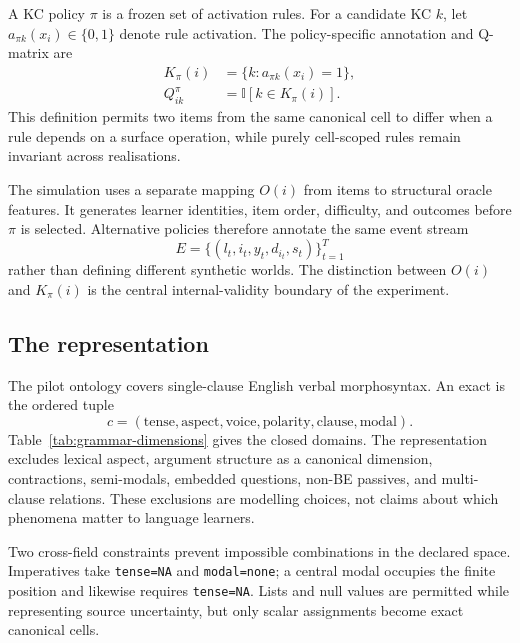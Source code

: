 A KC policy $\pi$ is a frozen set of activation rules.  For a candidate KC
$k$, let $a_{\pi k}(x_i)\in\{0,1\}$ denote rule activation.  The policy-specific
annotation and Q-matrix are
\begin{align}
 K_\pi(i) &= \{k:a_{\pi k}(x_i)=1\},\\
 Q^\pi_{ik} &= \mathbb{I}[k\in K_\pi(i)].
\end{align}
This definition permits two items from the same canonical cell to differ when
a rule depends on a surface operation, while purely cell-scoped rules remain
invariant across realisations.

The simulation uses a separate mapping $O(i)$ from items to structural oracle
features.  It generates learner identities, item order, difficulty, and
outcomes before $\pi$ is selected.  Alternative policies therefore annotate
the same event stream
\begin{equation}
 E=\{(l_t,i_t,y_t,d_{i_t},s_t)\}_{t=1}^{T}
\end{equation}
rather than defining different synthetic worlds.  The distinction between
$O(i)$ and $K_\pi(i)$ is the central internal-validity boundary of the
experiment.

\subsection{The \grammarcell representation}

The pilot ontology covers single-clause English verbal morphosyntax.  An exact
\grammarcell is the ordered tuple
\begin{equation}
 c=(\text{tense},\text{aspect},\text{voice},\text{polarity},
    \text{clause},\text{modal}).
\end{equation}
Table~\ref{tab:grammar-dimensions} gives the closed domains.  The representation
excludes lexical aspect, argument structure as a canonical dimension,
contractions, semi-modals, embedded questions, non-BE passives, and multi-clause
relations.  These exclusions are modelling choices, not claims about which
phenomena matter to language learners.



Two cross-field constraints prevent impossible combinations in the declared
space.  Imperatives take \texttt{tense=NA} and \texttt{modal=none}; a central
modal occupies the finite position and likewise requires \texttt{tense=NA}.
Lists and null values are permitted while representing source uncertainty, but
only scalar assignments become exact canonical cells.

